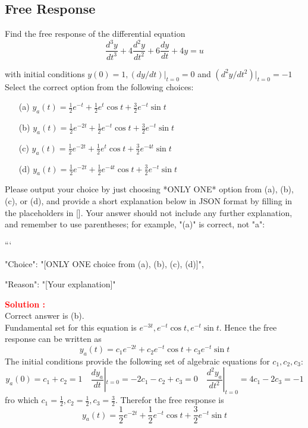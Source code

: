 \documentclass[12pt]{article}
\begin{document}
\subsection{Free Response}

Find the free response of the differential equation
\begin{equation}
    \frac{d^3y}{dt^3} + 4 \frac{d^2y}{dt^2} + 6 \frac{dy}{dt} + 4y = u
\end{equation}

with initial conditions \(y(0)=1, (dy/dt)|_{t=0} = 0\) and \((d^2y/dt^2)|_{t=0} = -1\)
Select the correct option from the following choices:
\begin{enumerate}
    \item [(a)] \(  y_a(t) = \frac{1}{2}e^{-t} + \frac{1}{2} e^{t}\cos t + \frac{3}{2} e^{-t} \sin t \)
    \item [(b)] \(  y_a(t) = \frac{1}{2}e^{-2t} + \frac{1}{2} e^{-t}\cos t + \frac{3}{2} e^{-t} \sin t \)
    \item [(c)] \(  y_a(t) = \frac{1}{2}e^{-2t} + \frac{1}{2} e^{t}\cos t + \frac{3}{2} e^{-4t} \sin t \)
    \item [(d)] \(  y_a(t) = \frac{1}{2}e^{-2t} + \frac{1}{2} e^{-4t}\cos t + \frac{3}{2} e^{-t} \sin t \)
\end{enumerate}


Please output your choice by just choosing *ONLY ONE* option from (a), (b), (c), or (d), and provide a short explanation below in JSON format by filling in the placeholders in []. Your answer should not include any further explanation, and remember to use parentheses; for example, "(a)" is correct, not "a": 

```
{

"Choice": "[ONLY ONE choice from (a), (b), (c), (d)]",

"Reason": "[Your explanation]"

}


\textbf{\textcolor{red}{Solution :}} \\
Correct answer is (b). \\
Fundamental set for this equation is \(e^{-3t},e^{-t}\cos t,e^{-t}\sin t\). Hence the free response can be written as 
\begin{equation}
    y_a(t) = c_1 e^{-2t} + c_2 e^{-t}\cos t + c_3 e^{-t} \sin t
\end{equation}
The initial conditions provide the following set of algebraic equations for \(c_1,c_2,c_3\):
\begin{equation}
    y_a(0) = c_1 + c_2 = 1 \quad \frac{dy_a}{dt}|_{t=0} = -2c_1 -c_2 + c_3 = 0 \quad \frac{d^2y_a}{dt^2}|_{t=0} = 4c_1 -2 c_3 = -1
\end{equation}
fro which \(c_1 = \frac{1}{2}, c_2 = \frac{1}{2}, c_3 = \frac{3}{2}\). Therefor the free response is 
\begin{equation}
    y_a(t) = \frac{1}{2}e^{-2t} + \frac{1}{2} e^{-t}\cos t + \frac{3}{2} e^{-t} \sin t
\end{equation}
\clearpage
\end{document}
